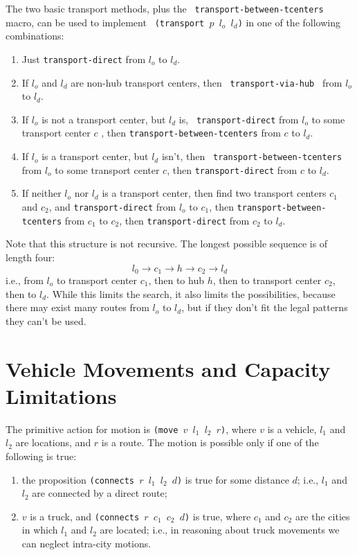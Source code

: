 \documentclass{article}
\begin{document}
The two basic transport methods, plus the {\tt
transport-between-tcenters} macro,  can be used to implement {\tt
(transport $p$ $l_o$ 
$l_d$)} in one of the following combinations:
\begin{enumerate}
\item Just {\tt transport-direct} from $l_o$ to $l_d$.

\item If $l_o$ and $l_d$ are non-hub transport centers, then {\tt
transport-via-hub } from $l_o$ to $l_d$. 

\item If $l_o$ is not a transport center, but $l_d$ is, {\tt
transport-direct} from 
$l_o$ to some transport center $c$ , 
then {\tt transport-between-tcenters} from $c$ to $l_d$.

\item If $l_o$ is a transport center, but $l_d$ isn't, then {\tt
transport-between-tcenters} from $l_o$ to some transport center $c$, then
{\tt transport-direct} from $c$ to $l_d$.

\item If neither $l_o$ nor $l_d$ is a transport center, then find two
transport centers $c_1$ and $c_2$, and {\tt transport-direct} from
$l_o$ to $c_1$, then {\tt transport-between-tcenters} from $c_1$ to $c_2$,
then {\tt transport-direct} from $c_2$ to $l_d$.
\end{enumerate}

Note that this structure is not recursive.  The longest possible
sequence is of length four:
$$ l_0 \longrightarrow c_1 \longrightarrow h \longrightarrow c_2
\longrightarrow l_d $$
i.e., from $l_o$ to transport center $c_1$, then to hub $h$, then to
transport center $c_2$, then to $l_d$.
While this limits the search, it also limits the possibilities,
because there may exist many routes from $l_o$ to $l_d$, but if they
don't fit the legal patterns they can't be used.

\section{Vehicle Movements and Capacity Limitations}

The primitive action for motion is {\tt (move $v$ $l_1$ $l_2$ $r$)},
where $v$ is a vehicle, $l_1$ and $l_2$ are locations, and $r$ is a
route.  The motion is possible only if one of the following is true:
\begin{enumerate}
\item the proposition {\tt (connects
$r$ $l_1$ $l_2$ $d$)} is true for some distance $d$; i.e., $l_1$ and
$l_2$ are connected by a direct route;
\item $v$ is a truck, and {\tt (connects $r$ $c_1$ $c_2$ $d$)} is
true, where $c_1$ and $c_2$ are the cities in which $l_1$ and $l_2$
are located; i.e., in reasoning about truck movements we can neglect
intra-city motions.
\end{enumerate}
\end{document}
